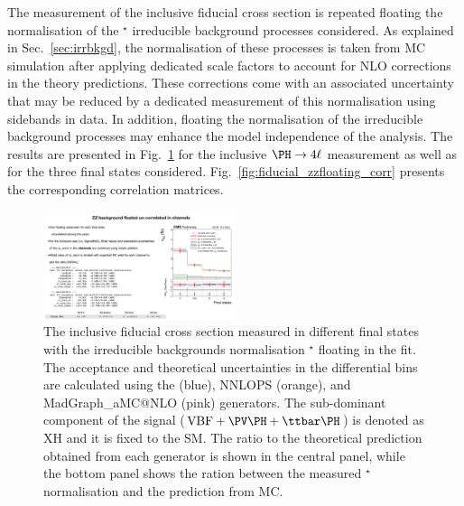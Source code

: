 
The measurement of the inclusive fiducial cross section is repeated floating the normalisation of the \PZ\PZ$^\star$ irreducible background processes considered.
As explained in Sec.~\ref{sec:irrbkgd}, the normalisation of these processes is taken from MC simulation after applying dedicated scale factors to account for  NLO corrections in the theory predictions.
These corrections come with an associated uncertainty that may be reduced by a dedicated measurement of this normalisation using sidebands in data.
In addition, floating the normalisation of the irreducible background processes may enhance the model independence of the analysis.
The results are presented in Fig.~\ref{fig:fiducial_zzfloating} for the inclusive $\Hllll$ measurement as well as for the three final states considered. Fig.~\ref{fig:fiducial_zzfloating_corr} presents the corresponding correlation matrices.

\begin{figure}[!htb]
	\centering
	\includegraphics[width=0.5\textwidth]{Images/H4L/zznorm/mass4l_zzfloating_unfoldwith_SM_125_asimov_v1.pdf}
	\caption{
		The inclusive fiducial cross section measured in different final states with the irreducible backgrounds normalisation \PZ\PZ$^\star$  floating in the fit.
		The acceptance and theoretical uncertainties in the differential bins are calculated using the \POWHEG (blue), NNLOPS (orange), and MadGraph\_aMC@NLO (pink) generators.
        The sub-dominant component of the signal ($\VBF + \VH + \ttH$) is denoted as XH and it is fixed to the SM.
        The ratio to the theoretical prediction obtained from each generator is shown in the central panel, while the bottom panel shows the ration between the measured \PZ\PZ$^\star$ normalisation and the prediction from MC.
		\label{fig:fiducial_zzfloating}}
\end{figure}

